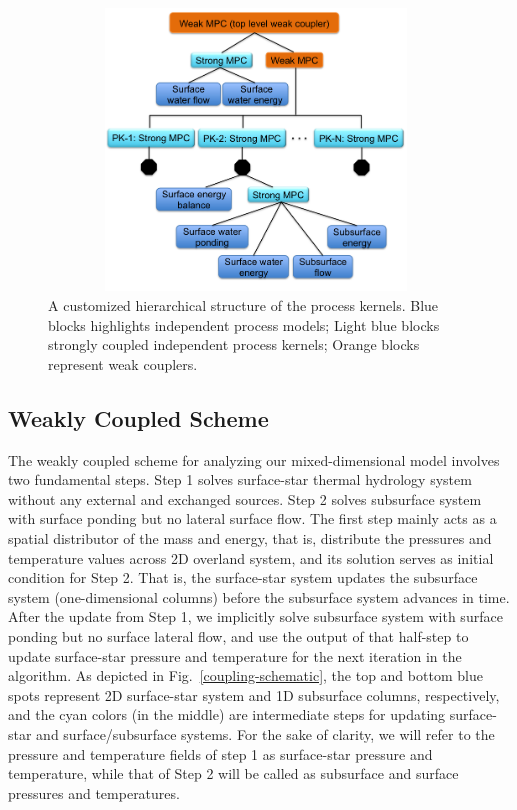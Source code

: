 \documentclass[review]{elsarticle}
\begin{document}
\begin{figure}[!htpb]
\centering
\includegraphics[height = 7.5cm, width=11cm]{figures/process-tree1.png}
\caption{A customized hierarchical structure of the process kernels. Blue blocks highlights independent process models; Light blue blocks strongly coupled independent process kernels; Orange blocks represent weak couplers.}
\label{pk-tree}
\end{figure}


\subsection{Weakly Coupled Scheme}
The weakly coupled scheme for analyzing our mixed-dimensional model involves two fundamental steps. Step 1 solves surface-star thermal hydrology system without  any external and exchanged sources. Step 2 solves subsurface system with surface ponding but no lateral surface flow. The first step mainly acts as a spatial distributor of the mass and energy, that is, distribute the pressures and temperature values across 2D overland system, and its solution serves as initial condition for Step 2. That is, the surface-star system updates the subsurface system (one-dimensional columns) before the subsurface system advances in time. After the update from Step 1, we implicitly solve subsurface system with surface ponding but no surface lateral flow, and use the output of that half-step to update surface-star pressure and temperature for the next iteration in the algorithm. As depicted in Fig.~\ref{coupling-schematic}, the top and bottom blue spots represent 2D surface-star system and 1D subsurface columns, respectively, and the cyan colors (in the middle) are intermediate steps for updating surface-star and surface/subsurface systems. For the sake of clarity, we will refer to the pressure and temperature fields of step 1 as surface-star pressure and temperature, while that of Step 2 will be called as subsurface and surface pressures and temperatures.
\end{document}
